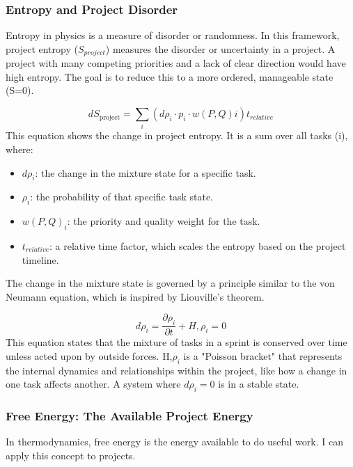 \documentclass{article}
\begin{document}
\subsubsection*{Entropy and Project Disorder}
Entropy in physics is a measure of disorder or randomness. In this framework, project entropy ($S_{project}$) measures the disorder or uncertainty in a project. A project with many competing priorities and a lack of clear direction would have high entropy. The goal is to reduce this to a more ordered, manageable state (S=0).

\begin{equation}
dS_{\text{project}} = \sum_i (d\rho_i \cdot p_i \cdot w(P, Q)i) t{_{relative}}
\end{equation}
This equation shows the change in project entropy. It is a sum over all tasks (i), where:
\begin{itemize}
\item $d\rho_i$: the change in the mixture state for a specific task.
\item $\rho_i$: the probability of that specific task state.
\item $w(P,Q)_i$: the priority and quality weight for the task.
\item $t_{relative}$: a relative time factor, which scales the entropy based on the project timeline.
\end{itemize}
The change in the mixture state is governed by a principle similar to the von Neumann equation, which is inspired by Liouville's theorem.

\begin{equation}
d\rho_i = \frac{\partial{\rho_i}}{\partial t} + {H, \rho_i} =0
\end{equation}
This equation states that the mixture of tasks in a sprint is conserved over time unless acted upon by outside forces. {H,$\rho_i$} is a "Poisson bracket" that represents the internal dynamics and relationships within the project, like how a change in one task affects another. A system where $d\rho_i=0$ is in a stable state.

\subsubsection*{Free Energy: The Available Project Energy}
In thermodynamics, free energy is the energy available to do useful work. I can apply this concept to projects.
\end{document}
